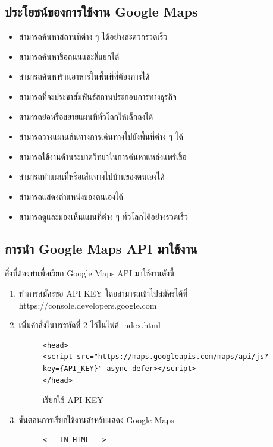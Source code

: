 \begin{enumerate}
		\subsection{ประโยชน์ของการใช้งาน Google Maps}
		\begin{itemize}
			\item สามารถค้นหาสถานที่ต่าง ๆ ได้อย่างสะดวกรวดเร็ว
			\item สามารถค้นหาชื่อถนนและสี่แยกได้
			\item สามารถค้นหาร้านอาหารในพื้นที่ที่ต้องการได้
			\item สามารถที่จะประชาสัมพันธ์สถานประกอบการทางธุรกิจ
			\item สามารถย่อหรือขยายแผนที่ทั่วโลกให้เล็กลงได้
			\item สามารถวางแผนเส้นทางการเดินทางไปยังพื้นที่ต่าง ๆ ได้
			\item สามารถใช้งานด้านระบาดวิทยาในการค้นหาแหล่งแพร่เชื้อ
			\item สามารถทำแผนที่หรือเส้นทางไปบ้านของตนเองได้
			\item สามารถแสดงตำแหน่งของตนเองได้
			\item สามารถดูและมองเห็นแผนที่ต่าง ๆ ทั่วโลกได้อย่างรวดเร็ว
		\end{itemize}

		\subsection{การนำ Google Maps API มาใช้งาน}
		สิ่งที่ต้องทำเพื่อเรียก Google Maps API มาใช้งานดังนี้
		\begin{enumerate}
			\item ทำการสมัครขอ API KEY โดยสามารถเข้าไปสมัครได้ที่ https://console.developers.google.com
			\item เพิ่มคำสั่งในบรรทัดที่ 2 ไว้ในไฟล์ index.html
			
			\begin{figure}[H]
				{\begin{lstlisting}
<head>
<script src="https://maps.googleapis.com/maps/api/js?key={API_KEY}" async defer></script>
</head>
				\end{lstlisting}}
			\centering
				\caption{เรียกใช้ API KEY}
				\label{Fig:googlemapapi}
			\end{figure}

			\item ขั้นตอนการเรียกใช้งานสำหรับแสดง Google Maps
			
			\begin{figure}[H]
				{\begin{lstlisting}
<-- IN HTML -->


\end{lstlisting}}
\end{figure}
\end{enumerate}
\end{enumerate}

